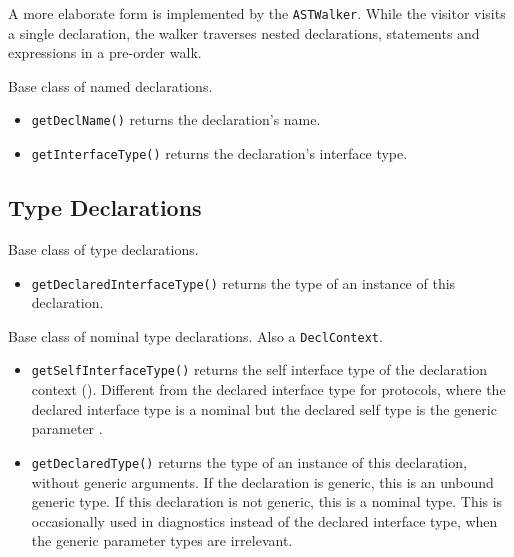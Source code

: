 \documentclass[../generics]{subfiles}
\begin{document}
A more elaborate form is implemented by the \texttt{ASTWalker}. While the visitor visits a single declaration, the walker traverses nested declarations, statements and expressions in a pre-order walk.

Base class of named declarations.

\begin{itemize}
\item \texttt{getDeclName()} returns the declaration's name.
\item \texttt{getInterfaceType()} returns the declaration's interface type.
\end{itemize}

\subsection*{Type Declarations}

Base class of type declarations.
\begin{itemize}
\item \texttt{getDeclaredInterfaceType()} returns the type of an instance of this declaration.
\end{itemize}

Base class of nominal type declarations. Also a \texttt{DeclContext}.
\begin{itemize}
\item \texttt{getSelfInterfaceType()} returns the self interface type of the declaration context (). Different from the declared interface type for protocols, where the declared interface type is a nominal but the declared self type is the generic parameter \tSelf.
\item \texttt{getDeclaredType()} returns the type of an instance of this declaration, without generic arguments. If the declaration is generic, this is an unbound generic type. If this declaration is not generic, this is a nominal type. This is occasionally used in diagnostics instead of the declared interface type, when the generic parameter types are irrelevant.
\end{itemize}
\end{document}
